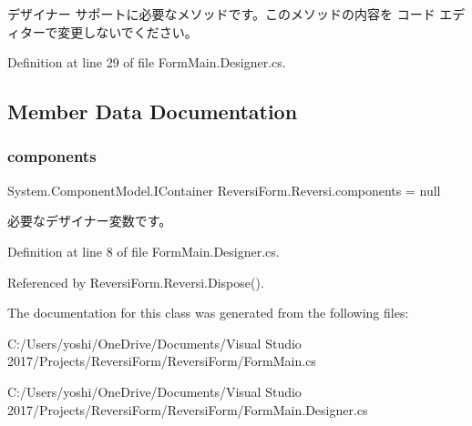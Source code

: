 デザイナー サポートに必要なメソッドです。このメソッドの内容を コード エディターで変更しないでください。 



Definition at line 29 of file Form\+Main.\+Designer.\+cs.



\subsection{Member Data Documentation}
\mbox{\label{class_reversi_form_1_1_reversi_a2edc9ab9401997c20553b26aadef1ea0}} 
\subsubsection{\texorpdfstring{components}{components}}
{\footnotesize\ttfamily System.\+Component\+Model.\+I\+Container Reversi\+Form.\+Reversi.\+components = null\hspace{0.3cm}{\ttfamily [private]}}



必要なデザイナー変数です。 



Definition at line 8 of file Form\+Main.\+Designer.\+cs.



Referenced by Reversi\+Form.\+Reversi.\+Dispose().



The documentation for this class was generated from the following files\+:\begin{DoxyCompactItemize}
\item 
C\+:/\+Users/yoshi/\+One\+Drive/\+Documents/\+Visual Studio 2017/\+Projects/\+Reversi\+Form/\+Reversi\+Form/Form\+Main.\+cs\item 
C\+:/\+Users/yoshi/\+One\+Drive/\+Documents/\+Visual Studio 2017/\+Projects/\+Reversi\+Form/\+Reversi\+Form/Form\+Main.\+Designer.\+cs\end{DoxyCompactItemize}
